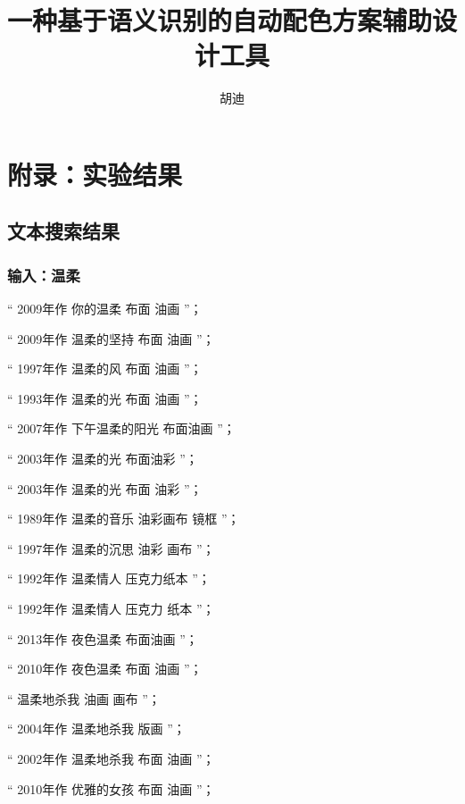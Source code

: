 \documentclass[master,oneside]{zjuthesis}
\title{一种基于语义识别的自动配色方案辅助设计工具}
\author{胡迪}
\institute{计算机科学与技术学院}
\begin{document}
\maketitle
\frontmatter



\tableofcontents
\listoffigures
\listoftables

\mainmatter

%



\backmatter


\appendix
\chapter{附录：实验结果}
\section{文本搜索结果}
\footnotesize
\subsection{输入：温柔}
“ 2009年作 你的温柔 布面 油画 ”；

“ 2009年作 温柔的坚持 布面 油画 ”；

“ 1997年作 温柔的风 布面 油画 ”；

“ 1993年作 温柔的光 布面 油画 ”；

“ 2007年作 下午温柔的阳光 布面油画 ”；

“ 2003年作 温柔的光 布面油彩 ”；

“ 2003年作 温柔的光 布面 油彩 ”；

“ 1989年作 温柔的音乐 油彩画布 镜框 ”；

“ 1997年作 温柔的沉思 油彩 画布 ”；

“ 1992年作 温柔情人 压克力纸本 ”；

“ 1992年作 温柔情人 压克力 纸本 ”；

“ 2013年作 夜色温柔 布面油画 ”；

“ 2010年作 夜色温柔 布面 油画 ”；

“ 温柔地杀我 油画 画布 ”；

“ 2004年作 温柔地杀我 版画 ”；

“ 2002年作 温柔地杀我 布面 油画 ”；

“ 2010年作 优雅的女孩 布面 油画 ”；
\end{document}
